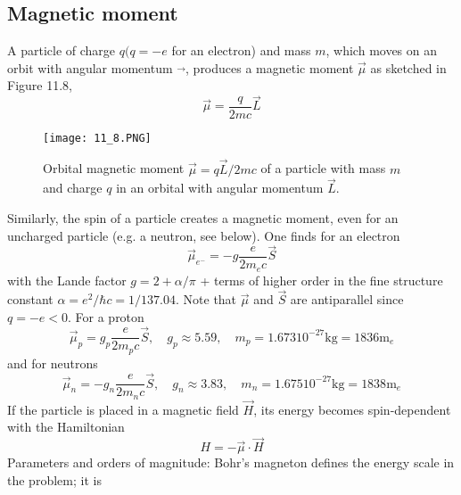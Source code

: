 \subsection{Magnetic moment}
A particle of charge $q (q = −e$ for an electron) and mass $m$, which moves on an orbit with angular momentum $\vec{}$, produces a magnetic moment $\vec{\mu}$ as sketched in Figure 11.8,
\begin{equation}
    \vec{\mu}=\frac{q}{2 m c} \vec{L}
    \end{equation}
\begin{figure}[ht]
    \begin{minipage}{0.5\textwidth}
        \centering
        \texttt{[image: 11\_8.PNG]}
    \end{minipage}
    \begin{minipage}{0.5\textwidth}
        \caption{Orbital magnetic moment $\vec{\mu}=q\vec{L}/2mc$ of a particle with mass $m$ and charge $q$ in an orbital with angular momentum $\vec{L}$.}
    \end{minipage}
\end{figure}
Similarly, the spin of a particle creates a magnetic moment, even for an uncharged particle (e.g. a neutron, see below). One finds for an electron
\begin{equation}
    \vec{\mu}_{e^{-}}=-g \frac{e}{2 m_{e} c} \vec{S}
    \end{equation}
with the Lande factor $g = 2 + \alpha/\pi$ + terms of higher order in the fine structure constant $\alpha=e^{2} / \hbar c=1 / 137.04$. Note that $\vec{\mu}$ and $\vec{S}$ are antiparallel since $q = −e <0$. For a proton
\begin{equation}
    \vec{\mu}_{p}=g_{p} \frac{e}{2 m_{p} c} \vec{S}, \quad g_{p} \approx 5.59, \quad m_{p}=1.67310^{-27} \mathrm{kg}=1836 \mathrm{m}_{e}
    \end{equation}
and for neutrons
\begin{equation}
    \vec{\mu}_{n}=-g_{n} \frac{e}{2 m_{n} c} \vec{S}, \quad g_{n} \approx 3.83, \quad m_{n}=1.67510^{-27} \mathrm{kg}=1838 \mathrm{m}_{e}
    \end{equation}
If the particle is placed in a magnetic field $\vec{H}$, its energy becomes spin-dependent with the Hamiltonian
\begin{equation}
    H=-\vec{\mu} \cdot \vec{H}
    \end{equation}
Parameters and orders of magnitude: Bohr's magneton defines the energy scale in the problem; it is
